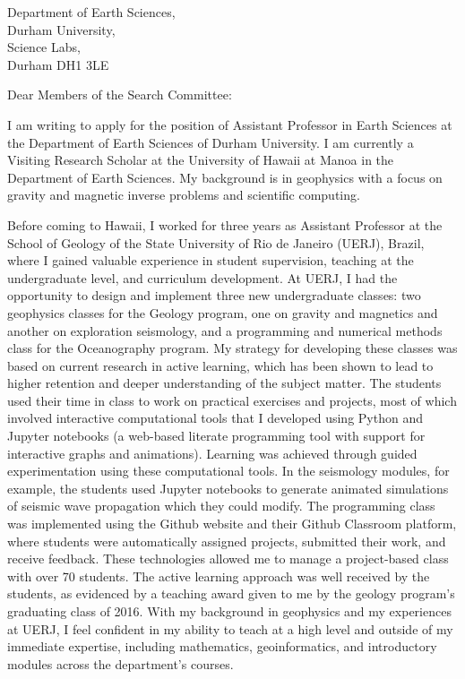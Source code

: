 \documentclass[11pt]{letter}
\begin{document}
\begin{letter}{
        Department of Earth Sciences,  \\
        Durham University, \\
        Science Labs, \\
        Durham DH1 3LE
}
\opening{Dear Members of the Search Committee:}

I am writing to apply for the position of
Assistant Professor in Earth Sciences
at the Department of Earth Sciences of Durham University.
I am currently a Visiting Research Scholar at the University of Hawaii at Manoa in the
Department of Earth Sciences.
My background is in geophysics with a focus on gravity and magnetic inverse problems and
scientific computing.

Before coming to Hawaii, I worked for three years as Assistant Professor at the School
of Geology of the State University of Rio de Janeiro (UERJ), Brazil, where I gained
valuable experience in student supervision, teaching at the undergraduate level, and
curriculum development.
At UERJ, I had the opportunity to design and implement three new undergraduate classes:
two geophysics classes for the Geology program, one on gravity and magnetics and another
on exploration seismology, and a programming and numerical methods class for the
Oceanography program.
My strategy for developing these classes was based on current research in active
learning, which has been shown to lead to higher retention and deeper understanding of
the subject matter.
The students used their time in class to work on practical exercises and projects, most
of which involved interactive computational tools that I developed using Python and
Jupyter notebooks (a web-based literate programming tool with support for interactive
graphs and animations).
Learning was achieved through guided experimentation using these computational tools.
In the seismology modules, for example, the students used Jupyter notebooks to generate
animated simulations of seismic wave propagation which they could modify.
The programming class was implemented using the Github website and their Github
Classroom platform, where students were automatically assigned projects, submitted their
work, and receive feedback.
These technologies allowed me to manage a project-based class with over 70 students.
The active learning approach was well received by the students, as evidenced by a
teaching award given to me by the geology program's graduating class of 2016.
With my background in geophysics and my experiences at UERJ, I feel confident in my
ability to teach at a high level and outside of my immediate expertise, including
mathematics, geoinformatics, and introductory modules across the department's courses.



\end{letter}
\end{document}

